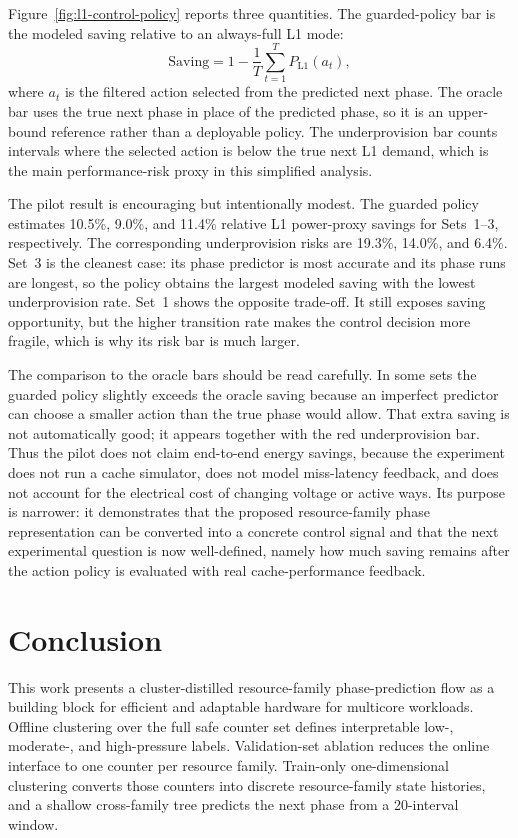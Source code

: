 \documentclass[10pt,twocolumn]{article}
\begin{document}
Figure~\ref{fig:l1-control-policy} reports three quantities.
The guarded-policy bar is the modeled saving relative to an always-full L1 mode:
\begin{equation}
  \text{Saving}=1-\frac{1}{T}\sum_{t=1}^{T}P_{\text{L1}}(a_t),
\end{equation}
where $a_t$ is the filtered action selected from the predicted next phase.
The oracle bar uses the true next phase in place of the predicted phase, so it is an upper-bound reference rather than a deployable policy.
The underprovision bar counts intervals where the selected action is below the true next L1 demand, which is the main performance-risk proxy in this simplified analysis.

The pilot result is encouraging but intentionally modest.
The guarded policy estimates 10.5\%, 9.0\%, and 11.4\% relative L1 power-proxy savings for Sets~1--3, respectively.
The corresponding underprovision risks are 19.3\%, 14.0\%, and 6.4\%.
Set~3 is the cleanest case: its phase predictor is most accurate and its phase runs are longest, so the policy obtains the largest modeled saving with the lowest underprovision rate.
Set~1 shows the opposite trade-off.
It still exposes saving opportunity, but the higher transition rate makes the control decision more fragile, which is why its risk bar is much larger.

The comparison to the oracle bars should be read carefully.
In some sets the guarded policy slightly exceeds the oracle saving because an imperfect predictor can choose a smaller action than the true phase would allow.
That extra saving is not automatically good; it appears together with the red underprovision bar.
Thus the pilot does not claim end-to-end energy savings, because the experiment does not run a cache simulator, does not model miss-latency feedback, and does not account for the electrical cost of changing voltage or active ways.
Its purpose is narrower:
it demonstrates that the proposed resource-family phase representation can be converted into a concrete control signal and that the next experimental question is now well-defined, namely how much saving remains after the action policy is evaluated with real cache-performance feedback.

\section{Conclusion}

This work presents a cluster-distilled resource-family phase-prediction flow as a building block for efficient and adaptable hardware for multicore workloads.
Offline clustering over the full safe counter set defines interpretable low-, moderate-, and high-pressure labels.
Validation-set ablation reduces the online interface to one counter per resource family.
Train-only one-dimensional clustering converts those counters into discrete resource-family state histories, and a shallow cross-family tree predicts the next phase from a 20-interval window.
\end{document}
